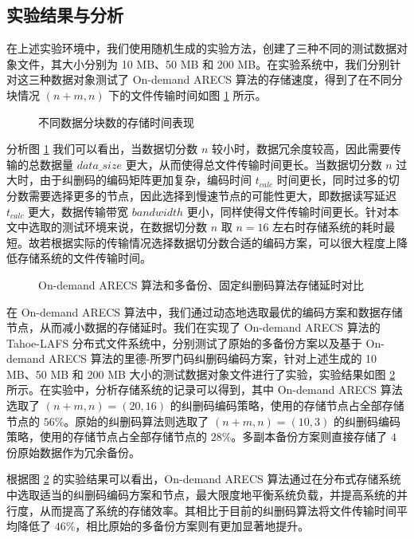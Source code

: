 \subsection{实验结果与分析}
在上述实验环境中，我们使用随机生成的实验方法，创建了三种不同的测试数据对象文件，其大小分别为 10 MB、50 MB 和 200 MB。在实验系统中，我们分别针对这三种数据对象测试了 On-demand ARECS 算法的存储速度，得到了在不同分块情况 $(n+m,n)$ 下的文件传输时间如图 \ref{p7} 所示。

\begin{figure}[!htb]
\centering
\resizebox{.8\textwidth}{!}{}
\caption{不同数据分块数的存储时间表现}
\label{p7}
\end{figure}

分析图 \ref{p7} 我们可以看出，当数据切分数 $n$ 较小时，数据冗余度较高，因此需要传输的总数据量 $data\_size$ 更大，从而使得总文件传输时间更长。当数据切分数 $n$ 过大时，由于纠删码的编码矩阵更加复杂，编码时间 $t_{calc}$ 时间更长，同时过多的切分数需要选择更多的节点，因此选择到慢速节点的可能性更大，即数据读写延迟 $t_{calc}$ 更大，数据传输带宽 $bandwidth$ 更小，同样使得文件传输时间更长。针对本文中选取的测试环境来说，在数据切分数 $n$ 取 $n=16$ 左右时存储系统的耗时最短。故若根据实际的传输情况选择数据切分数合适的编码方案，可以很大程度上降低存储系统的文件传输时间。

\begin{figure}[!htb]
\centering
\resizebox{.8\textwidth}{!}{}
\caption{On-demand ARECS 算法和多备份、固定纠删码算法存储延时对比}
\label{p8}
\end{figure}

在 On-demand ARECS 算法中，我们通过动态地选取最优的编码方案和数据存储节点，从而减小数据的存储延时。我们在实现了 On-demand ARECS 算法的 Tahoe-LAFS 分布式文件系统中，分别测试了原始的多备份方案以及基于 On-demand ARECS 算法的里德-所罗门码纠删码编码方案，针对上述生成的 10 MB、50 MB 和 200 MB 大小的测试数据对象文件进行了实验，实验结果如图 \ref{p8} 所示。在实验中，分析存储系统的记录可以得到，其中 On-demand ARECS 算法选取了 $(n+m,n)=(20,16)$ 的纠删码编码策略，使用的存储节点占全部存储节点的 $56\%$。原始的纠删码算法则选取了 $(n+m,n)=(10,3)$ 的纠删码编码策略，使用的存储节点占全部存储节点的 $28\%$。多副本备份方案则直接存储了 $4$ 份原始数据作为冗余备份。

根据图 \ref{p8} 的实验结果可以看出，On-demand ARECS 算法通过在分布式存储系统中选取适当的纠删码编码方案和节点，最大限度地平衡系统负载，并提高系统的并行度，从而提高了系统的存储效率。其相比于目前的纠删码算法将文件传输时间平均降低了 $46\%$，相比原始的多备份方案则有更加显著地提升。
